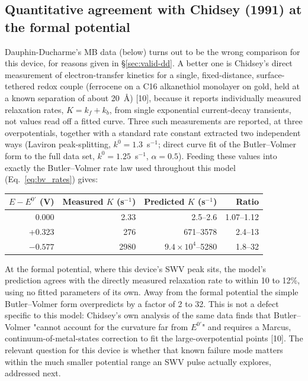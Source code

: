 \documentclass[10pt,a4paper]{article}
\numberwithin{equation}{section}
\newcommand{\cit}[1]{[#1]}
\begin{document}
\subsection{Quantitative agreement with Chidsey (1991) at the formal potential}
\label{sec:valid-chidsey}

Dauphin-Ducharme's MB data (below) turns out to be the wrong comparison for this device, for reasons given
in \S\ref{sec:valid-dd}. A better one is Chidsey's direct measurement of electron-transfer kinetics for a
single, fixed-distance, surface-tethered redox couple (ferrocene on a C16 alkanethiol monolayer on gold,
held at a known separation of about 20~\AA) \cit{10}, because it reports individually measured relaxation
rates, $K=k_f+k_b$, from single exponential current-decay transients, not values read off a fitted curve.
Three such measurements are reported, at three overpotentials, together with a standard rate constant
extracted two independent ways (Laviron peak-splitting, $k^0=1.3$~s$^{-1}$; direct curve fit of the
Butler--Volmer form to the full data set, $k^0=1.25$~s$^{-1}$, $\alpha=0.5$). Feeding these values into
exactly the Butler--Volmer rate law used throughout this model (Eq.~\eqref{eq:bv_rates}) gives:

\begin{center}
\small\renewcommand{\arraystretch}{1.2}
\begin{tabular}{@{}rrrr@{}}
\toprule
$E-E^{0\prime}$ (V) & Measured $K$ (s$^{-1}$) & Predicted $K$ (s$^{-1}$) & Ratio \\
\midrule
0.000  & 2.33 & 2.5--2.6   & 1.07--1.12 \\
+0.323 & 276  & 671--3578  & 2.4--13 \\
$-0.577$ & 2980 & $9.4\times10^4$--5280 & 1.8--32 \\
\bottomrule
\end{tabular}
\end{center}

At the formal potential, where this device's SWV peak sits, the model's prediction agrees with the directly
measured relaxation rate to within 10 to 12\%, using no fitted parameters of its own. Away from the formal
potential the simple Butler--Volmer form overpredicts by a factor of 2 to 32. This is not a defect specific
to this model: Chidsey's own analysis of the same data finds that Butler--Volmer "cannot account for the
curvature far from $E^{0\prime}$" and requires a Marcus, continuum-of-metal-states correction to fit the
large-overpotential points \cit{10}. The relevant question for this device is whether that known failure
mode matters within the much smaller potential range an SWV pulse actually explores, addressed next.
\end{document}

